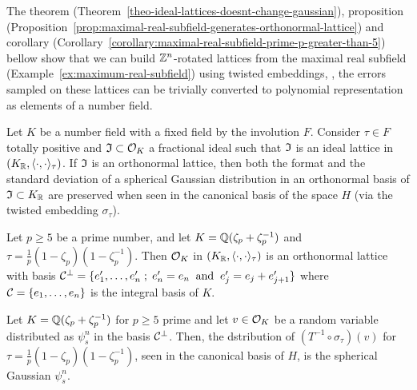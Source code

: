 \documentclass[a4paper,12pt]{article}
\begin{document}
\begin{text}
  The theorem (Theorem~\ref{theo-ideal-lattices-doesnt-change-gaussian}),
  proposition
  (Proposition~\ref{prop:maximal-real-subfield-generates-orthonormal-lattice})
  and corollary (Corollary~\ref{corollary:maximal-real-subfield-prime-p-greater-than-5}) bellow show that we can build $\mathbb{Z}^n$-rotated
  lattices from the maximal real subfield
  (Example~\ref{ex:maximum-real-subfield}) using twisted embeddings, \ie, the
  errors sampled on these lattices can be trivially converted to polynomial
  representation as elements of a number field.
\end{text}

\begin{theorem}\label{theo-ideal-lattices-doesnt-change-gaussian}
  Let $K$ be a number field with a fixed field by the involution $F$. Consider $\tau
  \in F$ totally positive and $\mathfrak{I} \subset \mathcal{O}_K$ a fractional ideal such that $\mathfrak{I}$ is an
  ideal lattice in $(K_{\mathbb{R}} , \langle \cdot,\cdot \rangle_\tau )$. If $\mathfrak{I}$ is an orthonormal lattice, then both the format and the standard deviation of a spherical Gaussian distribution in an orthonormal basis of $\mathfrak{I} \subset K_{\mathbb{R}}$ are preserved when seen in the canonical basis of the space $H$ (via the twisted embedding $\sigma_\tau$).
\end{theorem}

\begin{proposition}\label{prop:maximal-real-subfield-generates-orthonormal-lattice}
Let $p \geq 5$ be a prime number, and let $K = \mathbb{Q}(\zeta_{p} + \zeta_{p} ^{-1})$ and $\tau =
  \frac{1}{p}(1 - \zeta_p)( 1 - \zeta^{- 1}_p)$. Then $\mathcal{O}_K$ in $(K_{\mathbb{R}},\langle{\cdot,\cdot}\rangle_\tau)$ is an
  orthonormal lattice with basis $\mathcal{C}^\perp = \{e_1^\prime, \dots, e^\prime_n \;;\; e^\prime_n = e_n
  \;\; \text{and} \;\; e^\prime_j = e_j +  e^\prime_{j+ 1} \}$ where $\mathcal{C} = \{e_1,\dots,e_n\}$
  is the integral basis of $K$.
\end{proposition}

\begin{corollary}\label{corollary:maximal-real-subfield-prime-p-greater-than-5}
  Let $K = \mathbb{Q}(\zeta_{p} + \zeta_{p} ^{-1})$ for $p \geq 5$ prime and let $v \in \mathcal{O}_K$ be a random variable
  distributed as $\psi_s^n$ in the basis $\mathcal{C}^\perp$. Then, the dstribution of $(T^{-1}
  \circ \sigma_\tau)(v)$ for $\tau = \frac{1}{p}(1 - \zeta_p)( 1 - \zeta^{- 1}_p)$, seen in the
  canonical basis of $H$, is the spherical Gaussian $\psi_s^n$.
\end{corollary}
\end{document}
